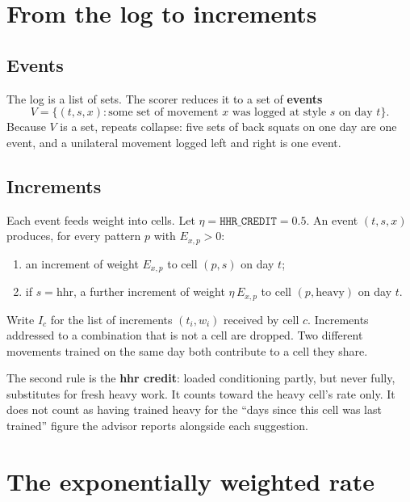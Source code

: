\documentclass[11pt]{article}
\theoremstyle{plain}
\theoremstyle{definition}
\newcommand{\code}[1]{\texttt{#1}}
\newcommand{\heavy}{\mathrm{heavy}}
\newcommand{\hhr}{\mathrm{hhr}}
\begin{document}
\section{From the log to increments}\label{sec:increments}

\subsection{Events}

The log is a list of sets. The scorer reduces it to a set of
\textbf{events}
\[
V = \bigl\{ (t, s, x) : \text{some set of movement } x \text{ was logged
at style } s \text{ on day } t \bigr\}.
\]
Because $V$ is a set, repeats collapse: five sets of back squats on one
day are one event, and a unilateral movement logged left and right is one
event.

\subsection{Increments}

Each event feeds weight into cells. Let $\eta = \code{HHR\_CREDIT} = 0.5$.
An event $(t, s, x)$ produces, for every pattern $p$ with $E_{x,p} > 0$:
\begin{enumerate}[nosep]
\item an increment of weight $E_{x,p}$ to cell $(p, s)$ on day $t$;
\item if $s = \hhr$, a further increment of weight $\eta\, E_{x,p}$ to
  cell $(p, \heavy)$ on day $t$.
\end{enumerate}
Write $I_c$ for the list of increments $(t_i, w_i)$ received by cell $c$.
Increments addressed to a combination that is not a cell are dropped.
Two different movements trained on the same day both contribute to a
cell they share.

The second rule is the \textbf{hhr credit}: loaded conditioning partly,
but never fully, substitutes for fresh heavy work. It counts toward the
heavy cell's rate only. It does not count as having trained heavy for the
``days since this cell was last trained'' figure the advisor reports
alongside each suggestion.

\section{The exponentially weighted rate}\label{sec:ewma}
\end{document}
